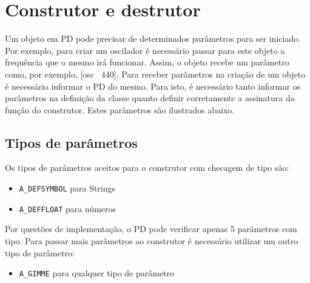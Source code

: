 \chapter{Construtor e destrutor}


Um objeto em PD pode precisar de determinados parâmetros para ser iniciado.
Por exemplo, para criar um oscilador é necessário passar para este objeto a
frequência que o mesmo irá funcionar.
Assim, o objeto recebe um parâmetro como, por exemplo, [osc~ 440].
Para receber parâmetros na criação de um objeto é necessário informar o PD do mesmo.
Para isto, é necessário tanto informar os parâmetros na definição da classe quanto
definir corretamente a assinatura da função do construtor.
Estes parâmetros são ilustrados abaixo.



\section{Tipos de parâmetros}

Os tipos de parâmetros aceitos para o construtor com checagem de tipo são:
\begin{itemize}
   \item \texttt{A\_DEFSYMBOL} para Strings
   \item \texttt{A\_DEFFLOAT} para números
\end{itemize}

Por questões de implementação, o PD pode verificar apenas 5 parâmetros com tipo.
Para passar mais parâmetros ao construtor é necessário utilizar um outro tipo
de parâmetro:

\begin{itemize}
   \item \texttt{A\_GIMME} para qualquer tipo de parâmetro
\end{itemize}

